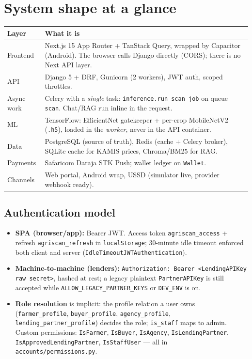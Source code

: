 \documentclass[11pt,a4paper]{article}
\newcommand{\code}[1]{\texttt{\allowbreak #1\allowbreak}}
\begin{document}
\section{System shape at a glance}

\begin{center}
\small
\begin{tabularx}{\textwidth}{@{} l X @{}}
\toprule
\textbf{Layer} & \textbf{What it is} \\
\midrule
Frontend & Next.js 15 App Router + TanStack Query, wrapped by Capacitor
           (Android). The browser calls Django directly (CORS); there is no
           Next API layer. \\
API & Django 5 + DRF, Gunicorn (2 workers), JWT auth, scoped throttles. \\
Async work & Celery with a \emph{single} task: \code{inference.run\_scan\_job}
              on queue \code{scan}. Chat/RAG run inline in the request. \\
ML & TensorFlow: EfficientNet gatekeeper + per-crop MobileNetV2
     (\code{.h5}), loaded in the \emph{worker}, never in the API container. \\
Data & PostgreSQL (source of truth), Redis (cache + Celery broker),
        SQLite cache for KAMIS prices, Chroma/BM25 for RAG. \\
Payments & Safaricom Daraja STK Push; wallet ledger on \code{Wallet}. \\
Channels & Web portal, Android wrap, USSD (simulator live, provider
            webhook ready). \\
\bottomrule
\end{tabularx}
\end{center}

\subsection*{Authentication model}
\begin{itemize}
  \item \textbf{SPA (browser/app):} Bearer JWT. Access token
        \code{agriscan\_access} + refresh \code{agriscan\_refresh} in
        \code{localStorage}; 30-minute idle timeout enforced both client
        and server (\code{IdleTimeoutJWTAuthentication}).
  \item \textbf{Machine-to-machine (lenders):} \code{Authorization: Bearer
        <LendingAPIKey raw secret>}, hashed at rest; a legacy plaintext
        \code{PartnerAPIKey} is still accepted while
        \code{ALLOW\_LEGACY\_PARTNER\_KEYS} or \code{DEV\_ENV} is on.
  \item \textbf{Role resolution} is implicit: the profile relation a user
        owns (\code{farmer\_profile}, \code{buyer\_profile},
        \code{agency\_profile}, \code{lending\_partner\_profile}) decides the
        role; \code{is\_staff} maps to admin. Custom permissions:
        \code{IsFarmer}, \code{IsBuyer}, \code{IsAgency},
        \code{IsLendingPartner}, \code{IsApprovedLendingPartner},
        \code{IsStaffUser} --- all in \code{accounts/permissions.py}.
\end{itemize}
\end{document}
